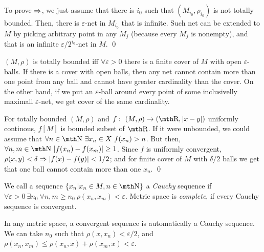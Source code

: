 To prove $\Rightarrow$, we just assume that there is $i_0$ such that 
$(M_{i_0},\rho_{i_0})$ is not totally bounded. Then, there is 
$\varepsilon$-net in $M_{i_0}$ that is infinite. Such net can 
be extended to $M$ by picking arbitrary point in any $M_j$ 
(because every $M_j$ is nonempty), and that is an infinite 
$\varepsilon/2^{i_0}$-net in $M$. 
\qed

\smallskip
$(M,\rho)$ is totally bounded iff $\forall \varepsilon >0$ 
there is a finite cover of $M$ with open $\varepsilon$-balls.
If there is a cover with open balls, then any net cannot contain more 
than one point from any ball and cannot have greater cardinality 
than the cover. On the other hand, if we put an $\varepsilon$-ball 
around every point of some inclusivelly maximall $\varepsilon$-net, 
we get cover of the same cardinality.

\smallskip
For totally bounded $(M,\rho)$ and $f:\ (M,\rho)\to (\R,|x-y|)$ uniformly 
continous, $f[M]$ is bounded subset of $\R$. If it were unbounded, 
we could assume that $\forall n\in \N\ \exists x_n\in X\ f(x_n)>n$. 
But then, $\forall n,m\in \N\ |f(x_n)-f(x_m)|\geq 1$. Since $f$ is 
uniformly convergent, $\rho(x,y)< \delta \Rightarrow |f(x)-f(y)|<1/2$; and 
for finite cover of $M$ with $\delta/2$ balls we get that one ball 
cannot contain more than one $x_n$.
\qed

\medskip

 We call a sequence $\{x_n|x_n \in M, n\in \N\}$ 
a {\it Cauchy} sequence if $\forall \varepsilon>0\ \exists n_0\ \forall n,m\geq n_0
\ \rho(x_n,x_m) < \varepsilon$. Metric space is {\it complete}, if every Cauchy 
sequence is convergent. 

In any metric space, a convergent sequence is automatically a Cauchy sequence. 
We can take $n_0$ such that $\rho(x,x_n) < \varepsilon/2$, and $\rho(x_n,x_m) 
\leq \rho(x_n,x) + \rho(x_m,x) < \varepsilon$.



